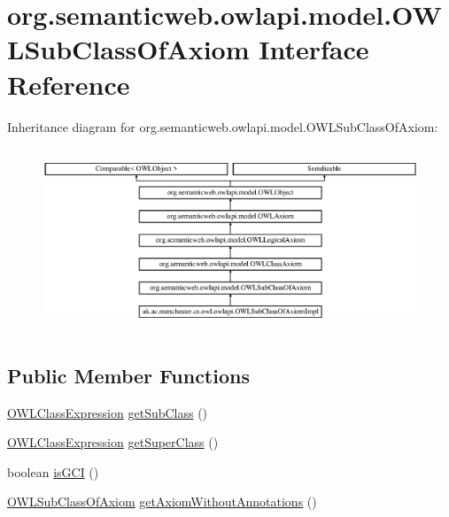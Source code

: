 \hypertarget{interfaceorg_1_1semanticweb_1_1owlapi_1_1model_1_1_o_w_l_sub_class_of_axiom}{\section{org.\-semanticweb.\-owlapi.\-model.\-O\-W\-L\-Sub\-Class\-Of\-Axiom Interface Reference}
\label{interfaceorg_1_1semanticweb_1_1owlapi_1_1model_1_1_o_w_l_sub_class_of_axiom}
}
Inheritance diagram for org.\-semanticweb.\-owlapi.\-model.\-O\-W\-L\-Sub\-Class\-Of\-Axiom\-:\begin{figure}[H]
\begin{center}
\leavevmode
\includegraphics[height=5.521127cm]{interfaceorg_1_1semanticweb_1_1owlapi_1_1model_1_1_o_w_l_sub_class_of_axiom}
\end{center}
\end{figure}
\subsection*{Public Member Functions}
\begin{DoxyCompactItemize}
\item 
\hyperlink{interfaceorg_1_1semanticweb_1_1owlapi_1_1model_1_1_o_w_l_class_expression}{O\-W\-L\-Class\-Expression} \hyperlink{interfaceorg_1_1semanticweb_1_1owlapi_1_1model_1_1_o_w_l_sub_class_of_axiom_a2275516ea9875c64a647f01baf9d0bc8}{get\-Sub\-Class} ()
\item 
\hyperlink{interfaceorg_1_1semanticweb_1_1owlapi_1_1model_1_1_o_w_l_class_expression}{O\-W\-L\-Class\-Expression} \hyperlink{interfaceorg_1_1semanticweb_1_1owlapi_1_1model_1_1_o_w_l_sub_class_of_axiom_ae85c68ffe81340bd76ef75385f52a438}{get\-Super\-Class} ()
\item 
boolean \hyperlink{interfaceorg_1_1semanticweb_1_1owlapi_1_1model_1_1_o_w_l_sub_class_of_axiom_a4d6cb4586b2d2a61b60e4f870c98e248}{is\-G\-C\-I} ()
\item 
\hyperlink{interfaceorg_1_1semanticweb_1_1owlapi_1_1model_1_1_o_w_l_sub_class_of_axiom}{O\-W\-L\-Sub\-Class\-Of\-Axiom} \hyperlink{interfaceorg_1_1semanticweb_1_1owlapi_1_1model_1_1_o_w_l_sub_class_of_axiom_a877907dafd743aceaed818c1b4a15092}{get\-Axiom\-Without\-Annotations} ()
\end{DoxyCompactItemize}


